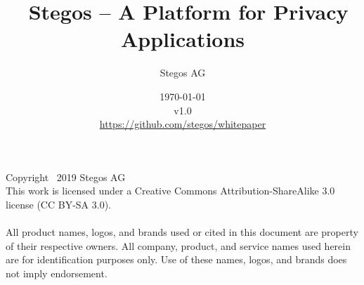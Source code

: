 \documentclass[8pt,fleqn,openany]{book}
\title{\textbf{\sffamily\color{white} \
Stegos -- A Platform for Privacy Applications}}
\author{\small\sffamily\color{white}
Stegos AG}
\date{\small\sffamily\color{white} \today \\v1.0\\
\small\colorlet{urllinkcolor}{white}\url{https://github.com/stegos/whitepaper}
}
\begin{document}
\raggedbottom
{}

\thispagestyle{fancy}

\maketitle

\nobreakspace

\vfill{\footnotesize\noindent{}Copyright \textcopyright\ 2019 Stegos AG\\
This work is licensed under a Creative Commons Attribution-ShareAlike 3.0
license (CC BY-SA 3.0).\\\\
All product names, logos, and brands used or cited in this document are
property of their respective owners. All company, product, and service names
used herein are for identification purposes only. Use of these names, logos,
and brands does not imply endorsement.}
\end{document}

